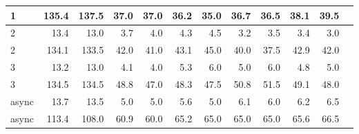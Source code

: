 \documentclass[12pt,a4paper]{report}
\begin{document}
\begin{table}[H]
\begin{tabular}{|l|r|r|r|r|r|r|r|r|r|r|r|}
		1                        & 135.4                          & 137.5                          & 37.0                          & 37.0                          & 36.2                            & 35.0 & 36.7 & 36.5 & 38.1 & 39.5 \\ \hline
		2                        & 13.4                           & 13.0                           & 3.7                           & 4.0                           & 4.3                             & 4.5  & 3.2  & 3.5  & 3.4  & 3.0  \\ \hline
		2                        & 134.1                          & 133.5                          & 42.0                          & 41.0                          & 43.1                            & 45.0 & 40.0 & 37.5 & 42.9 & 42.0 \\ \hline
		3                        & 13.2                           & 13.0                           & 4.1                           & 4.0                           & 5.3                             & 6.0  & 5.0  & 6.0  & 4.8  & 5.0  \\ \hline
		3                        & 134.5                          & 134.5                          & 48.8                          & 47.0                          & 48.3                            & 47.5 & 50.8 & 51.5 & 49.1 & 48.0 \\ \hline
		async                    & 13.7                           & 13.5                           & 5.0                           & 5.0                           & 5.6                             & 5.0  & 6.1  & 6.0  & 6.2  & 6.5  \\ \hline
		async                    & 113.4                          & 108.0                          & 60.9                          & 60.0                          & 65.2                            & 65.0 & 65.0 & 65.0 & 65.6 & 66.5 \\ \hline
	\end{tabular}
\end{table}
\end{document}
